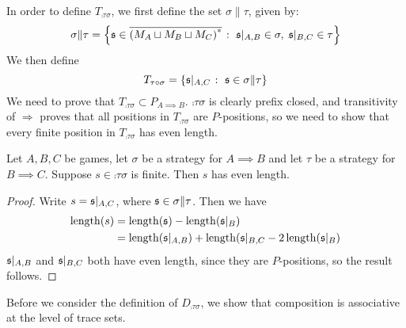 \documentclass{entcs} \usepackage{prentcsmacro}
\newcommand{\0}{{\mathtt{0}}}
\begin{document}
In order to define $T_{\comp\tau\sigma}$, we first define the set $\sigma\|\tau$, given by:
\[
  \sigma\|\tau = \left\{\mathfrak s\in{\overline{{(M_A\sqcup M_B\sqcup M_C)}^{*}}}\;\colon\; \mathfrak s\vert_{A,B}\in\sigma,\;\mathfrak s\vert_{B,C}\in\tau\right\}
  \]
We then define
\[
  T_{\tau \circ \sigma} = \{\mathfrak s\vert_{A,C}\;\colon\; \mathfrak s\in\sigma\|\tau\}
  \]
We need to prove that $T_{\comp\tau\sigma}\subset P_{A\implies B}$.  $\comp\tau\sigma$ is clearly prefix closed, and transitivity of $\Rightarrow$ proves that all positions in $T_{\comp\tau\sigma}$ are $P$-positions, so we need to show that every finite position in $T_{\comp\tau\sigma}$ has even length.

\begin{proposition}
  Let $A,B,C$ be games, let $\sigma$ be a strategy for $A\implies B$ and let $\tau$ be a strategy for $B\implies C$.  Suppose $s\in\comp\tau\sigma$ is finite.  Then $s$ has even length.
\end{proposition}
\begin{proof}
  Write $s=\mathfrak s\vert_{A,C}$, where $\mathfrak s\in\sigma\|\tau$.  Then we have
  \begin{align*}
    \operatorname{length}(s) & = \operatorname{length}(\mathfrak s) - \operatorname{length}(\mathfrak s\vert_B) \\
     & = \operatorname{length}(\mathfrak s\vert_{A,B}) + \operatorname{length}(\mathfrak s\vert_{B,C} - 2\operatorname{length}(\mathfrak s\vert_B)
  \end{align*}
  $\mathfrak s\vert_{A,B}$ and $\mathfrak s\vert_{B,C}$ both have even length, since they are $P$-positions, so the result follows.
\end{proof}

Before we consider the definition of $D_{\comp\tau\sigma}$, we show that composition is associative at the level of trace sets.  
\end{document}
